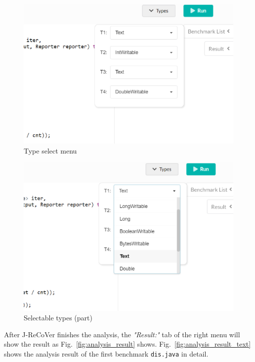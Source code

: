 \begin{figure}
\begin{center}
\includegraphics[width=.8\linewidth]{screenshots/type_select_menu.eps}
\caption{Type select menu}
\label{fig:type_select_menu}
\end{center}
\end{figure}

\begin{figure}
\begin{center}
\includegraphics[width=.8\linewidth]{screenshots/selectable_types.eps}
\caption{Selectable types (part)}
\label{fig:selectable_types}
\end{center}
\end{figure}

After J-ReCoVer finishes the analysis, the \emph{"Result:"} tab of the right menu will show the result as Fig.~\ref{fig:analysis_result} shows. Fig.~\ref{fig:analysis_result_text} shows the analysis result of the first benchmark \texttt{dis.java} in detail.

